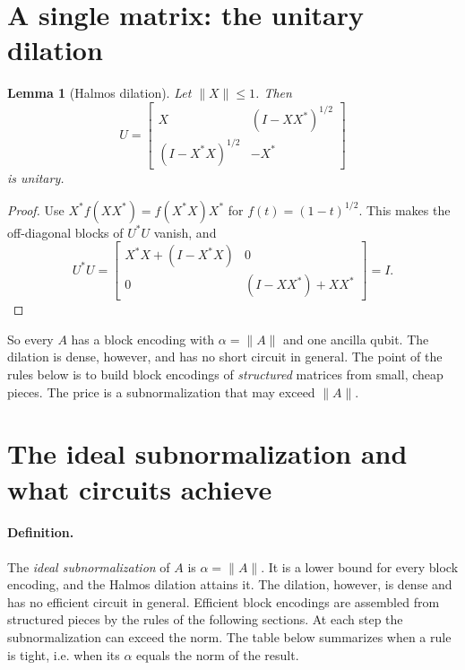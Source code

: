 \documentclass[11pt,a4paper]{article}
\newtheorem{lemma}{Lemma}
\begin{document}
\section{A single matrix: the unitary dilation}

\begin{lemma}[Halmos dilation]
Let $\|X\|\le1$. Then
\[
U=\begin{bmatrix} X & (I-XX^*)^{1/2}\\ (I-X^*X)^{1/2} & -X^*\end{bmatrix}
\]
is unitary.
\end{lemma}
\begin{proof}
Use $X^*f(XX^*)=f(X^*X)X^*$ for $f(t)=(1-t)^{1/2}$. This makes the off-diagonal
blocks of $U^*U$ vanish, and
\[
U^*U=\begin{bmatrix}X^*X+(I-X^*X) & 0\\ 0 & (I-XX^*)+XX^*\end{bmatrix}=I .
\]
\end{proof}

So every $A$ has a block encoding with $\alpha=\|A\|$ and one ancilla qubit. The
dilation is dense, however, and has no short circuit in general. The point
of the rules below is to build block encodings of \emph{structured} matrices
from small, cheap pieces. The price is a subnormalization that may exceed
$\|A\|$.

\section{The ideal subnormalization and what circuits achieve}\label{sec:ideal}

\paragraph{Definition.} The \emph{ideal subnormalization} of $A$ is $\alpha=\|A\|$. It is a
lower bound for every block encoding, and the Halmos dilation attains it.
The dilation, however, is dense and has no efficient circuit in general.
Efficient block encodings are assembled from structured pieces by the
rules of the following sections. At each step the subnormalization can
exceed the norm. The table below summarizes when a rule is tight, i.e.
when its $\alpha$ equals the norm of the result.
\end{document}
